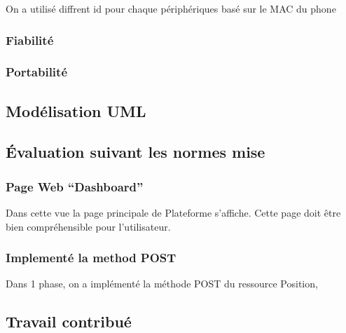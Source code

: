 On a utilisé diffrent id pour chaque périphériques basé sur le MAC du phone

\subsubsection{Fiabilité}

\subsubsection{Portabilité}

\subsection{Modélisation UML}
\subsection{Évaluation suivant les normes mise}
\subsubsection{Page Web ``Dashboard''}
Dans cette vue la page principale de Plateforme s'affiche. Cette page doit être
bien compréhensible pour l'utilisateur.

\subsubsection{Implementé la method POST}

Dans 1\ier{} phase, on a implémenté la méthode POST du ressource Position,

\subsection{Travail contribué}

